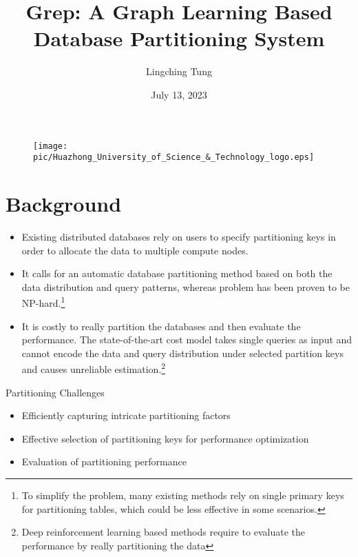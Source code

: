 \documentclass{beamer}
\author{Lingching Tung}
\title{Grep: A Graph Learning Based Database Partitioning System}
\subtitle{}
\institute{Intelligence Data Storage And Management Laboratory}
\date{July 13, 2023}
\begin{document}
\kaishu
\begin{frame}
    \titlepage
    \begin{figure}[htpb]
        \begin{center}
            \texttt{[image: pic/Huazhong\_University\_of\_Science\_\&\_Technology\_logo.eps]}
        \end{center}
    \end{figure}
\end{frame}

\begin{frame}
    \tableofcontents[sectionstyle=show,subsectionstyle=show/shaded/hide,subsubsectionstyle=show/shaded/hide]
\end{frame}

\section{Background}
\begin{frame}
    \begin{itemize}[<+-| alert@+>]
        \item Existing distributed databases rely on users to specify partitioning keys in order to allocate the data to multiple compute nodes.

        \item It calls for an automatic database partitioning method based on both the data distribution and query patterns, whereas problem has been proven to be NP-hard.{\footnote{To simplify the problem, many existing methods rely on single primary keys for partitioning tables, which could be less effective in some scenarios.}}

        \item It is costly to really partition the databases and then evaluate the performance. The state-of-the-art cost model takes single queries as input and cannot encode the data and query distribution under selected partition keys and causes unreliable estimation.{\footnote{Deep reinforcement learning based methods require to evaluate the performance by really partitioning the data}}
    \end{itemize}
\end{frame}

\begin{frame}{Partitioning Challenges}
    \begin{itemize}
        \item Efficiently capturing intricate partitioning factors
        \item Effective selection of partitioning keys for performance optimization
        \item Evaluation of partitioning performance
    \end{itemize}
\end{frame}
\end{document}
